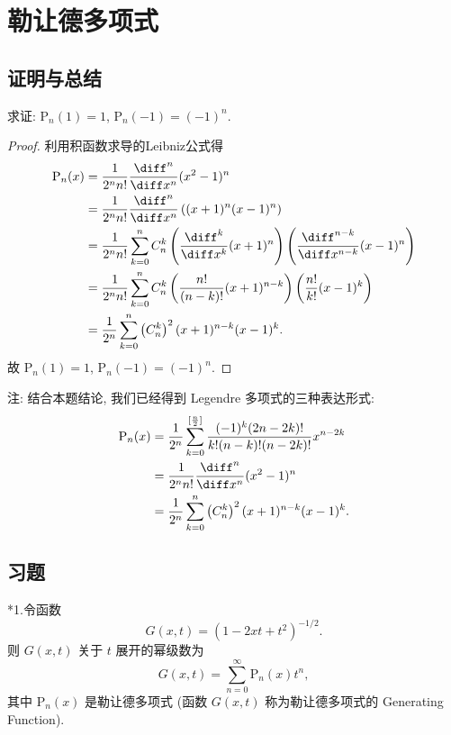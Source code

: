 \section{勒让德多项式}



\subsection{证明与总结}


求证: $\mathrm{P}_n(1)=1$, $\mathrm{P}_n(-1)=(-1)^n$.

\begin{proof}
利用积函数求导的Leibniz公式得
  \begin{align*}
  \mathrm{P}_n(x)&=\frac{1}{2^nn!}\frac{\diff^n}{\diff x^n}(x^2-1)^n\\
  &=\frac{1}{2^nn!}\frac{\diff^n}{\diff x^n}\left((x+1)^n(x-1)^n\right)\\
  &=\frac{1}{2^nn!}\sum_{k=0}^nC_n^k\left(\frac{\diff^k}{\diff x^k}(x+1)^n\right)\left(\frac{\diff^{n-k}}{\diff x^{n-k}}(x-1)^n\right)\\
  &=\frac{1}{2^nn!}\sum_{k=0}^nC_n^k\left(\frac{n!}{(n-k)!}(x+1)^{n-k}\right)\left(\frac{n!}{k!}(x-1)^k\right)\\
  &=\frac{1}{2^n}\sum_{k=0}^n\left(C_n^k\right)^2(x+1)^{n-k}(x-1)^k.
  \end{align*}
  故 $\mathrm{P}_n(1)=1$, $\mathrm{P}_n(-1)=(-1)^n$.
\end{proof}

注: 结合本题结论, 我们已经得到 Legendre 多项式的三种表达形式:\raggedbottom
\begin{align*}
  \mathrm{P}_n(x) 
  & = \frac{1}{2^n}\sum_{k=0}^{[\frac{n}{2}]}\frac{(-1)^k(2n-2k)!}{k!(n-k)!(n-2k)!}x^{n-2k} \\
  & = \frac{1}{2^nn!}\frac{\diff^n}{\diff x^n}(x^2-1)^n \\
  & = \frac{1}{2^n}\sum_{k=0}^n\left(C_n^k\right)^2(x+1)^{n-k}(x-1)^k.
\end{align*}


\subsection{习题}


*1.令函数
\[G(x,t)=(1-2xt+t^2)^{-1/2}.\]
则 $G(x,t)$ 关于 $t$ 展开的幂级数为
\[G(x,t)=\sum_{n=0}^{\infty}\mathrm{P}_n(x)t^n,\]
其中 $\mathrm{P}_n(x)$ 是勒让德多项式 (函数 $G(x,t)$ 称为勒让德多项式的 Generating Function).

